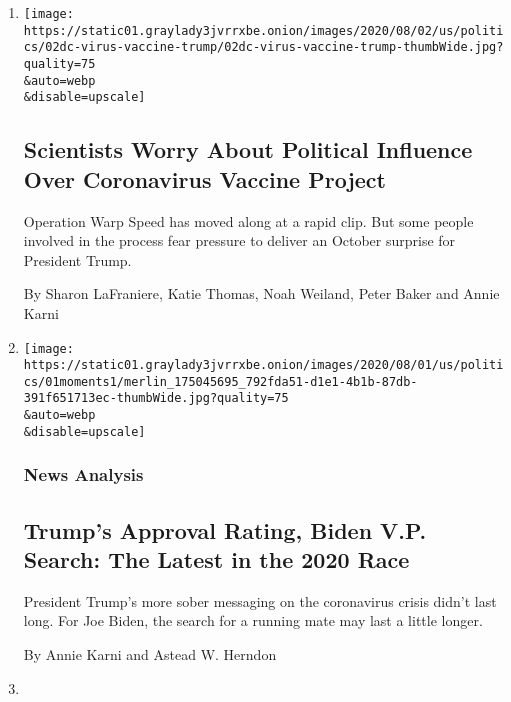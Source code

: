 \begin{enumerate}
\def\labelenumi{\arabic{enumi}.}
\item
  \href{/2020/08/02/us/politics/coronavirus-vaccine.html}{}

  \texttt{[image: https://static01.graylady3jvrrxbe.onion/images/2020/08/02/us/politics/02dc-virus-vaccine-trump/02dc-virus-vaccine-trump-thumbWide.jpg?quality=75\\\&auto=webp\\\&disable=upscale]}

  \hypertarget{scientists-worry-about-political-influence-over-coronavirus-vaccine-project}{%
  \subsection{Scientists Worry About Political Influence Over
  Coronavirus Vaccine
  Project}\label{scientists-worry-about-political-influence-over-coronavirus-vaccine-project}}

  Operation Warp Speed has moved along at a rapid clip. But some people
  involved in the process fear pressure to deliver an October surprise
  for President Trump.

  By Sharon LaFraniere, Katie Thomas, Noah Weiland, Peter Baker and
  Annie Karni
\item
  \href{/2020/08/01/us/politics/trump-biden-polls-vp.html}{}

  \texttt{[image: https://static01.graylady3jvrrxbe.onion/images/2020/08/01/us/politics/01moments1/merlin\_175045695\_792fda51-d1e1-4b1b-87db-391f651713ec-thumbWide.jpg?quality=75\\\&auto=webp\\\&disable=upscale]}

  \hypertarget{news-analysis}{%
  \subsubsection{News Analysis}\label{news-analysis}}

  \hypertarget{trumps-approval-rating-biden-vp-search-the-latest-in-the-2020-race}{%
  \subsection{Trump's Approval Rating, Biden V.P. Search: The Latest in
  the 2020
  Race}\label{trumps-approval-rating-biden-vp-search-the-latest-in-the-2020-race}}

  President Trump's more sober messaging on the coronavirus crisis
  didn't last long. For Joe Biden, the search for a running mate may
  last a little longer.

  By Annie Karni and Astead W. Herndon
\item
  \href{/2020/07/31/us/politics/trump-campaign-tv-advertising.html}{}


\end{enumerate}
